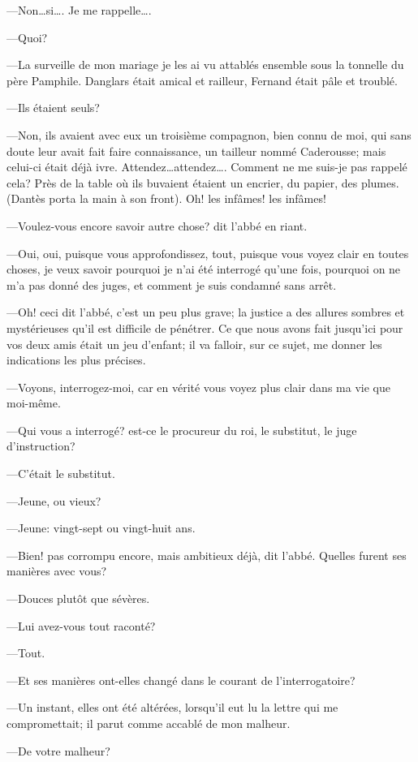 —Non\dots si\dots. Je me rappelle\dots.

—Quoi?

—La surveille de mon mariage je les ai vu attablés ensemble sous la tonnelle du père Pamphile. Danglars était amical et railleur, Fernand était pâle et troublé.

—Ils étaient seuls?

—Non, ils avaient avec eux un troisième compagnon, bien connu de moi, qui sans doute leur avait fait faire connaissance, un tailleur nommé Caderousse; mais celui-ci était déjà ivre. Attendez\dots attendez\dots. Comment ne me suis-je pas rappelé cela? Près de la table où ils buvaient étaient un encrier, du papier, des plumes. (Dantès porta la main à son front). Oh! les infâmes! les infâmes!

—Voulez-vous encore savoir autre chose? dit l'abbé en riant.

—Oui, oui, puisque vous approfondissez, tout, puisque vous voyez clair en toutes choses, je veux savoir pourquoi je n'ai été interrogé qu'une fois, pourquoi on ne m'a pas donné des juges, et comment je suis condamné sans arrêt.

—Oh! ceci dit l'abbé, c'est un peu plus grave; la justice a des allures sombres et mystérieuses qu'il est difficile de pénétrer. Ce que nous avons fait jusqu'ici pour vos deux amis était un jeu d'enfant; il va falloir, sur ce sujet, me donner les indications les plus précises.

—Voyons, interrogez-moi, car en vérité vous voyez plus clair dans ma vie que moi-même.

—Qui vous a interrogé? est-ce le procureur du roi, le substitut, le juge d'instruction?

—C'était le substitut.

—Jeune, ou vieux?

—Jeune: vingt-sept ou vingt-huit ans.

—Bien! pas corrompu encore, mais ambitieux déjà, dit l'abbé. Quelles furent ses manières avec vous?

—Douces plutôt que sévères.

—Lui avez-vous tout raconté?

—Tout.

—Et ses manières ont-elles changé dans le courant de l'interrogatoire?

—Un instant, elles ont été altérées, lorsqu'il eut lu la lettre qui me compromettait; il parut comme accablé de mon malheur.

—De votre malheur?

